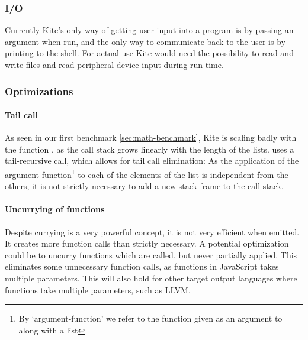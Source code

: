 \subsubsection{I/O}
Currently Kite's only way of getting user input into a program is by passing an argument when run, and the only way to communicate back to the user is by printing to the shell. For actual use Kite would need the possibility to read and write files and read peripheral device input during run-time.

\subsubsection{Optimizations}
\label{sec:disc-optimization}

\paragraph{Tail call}
As seen in our first benchmark \ref{sec:math-benchmark}, Kite is scaling badly with the function , as the call stack grows linearly with the length of the lists.  uses a tail-recursive call, which allows for tail call elimination: As the application of the argument-function\footnote{By `argument-function' we refer to the function given as an argument to  along with a list} to each of the elements of the list is independent from the others, it is not strictly necessary to add a new stack frame to the call stack.

\paragraph{Uncurrying of functions}
Despite currying is a very powerful concept, it is not very efficient when emitted. It creates more function calls than strictly necessary. A potential optimization could be to uncurry functions which are called, but never partially applied. This eliminates some unnecessary function calls, as functions in JavaScript takes multiple parameters. This will also hold for other target output languages where functions take multiple parameters, such as LLVM.
